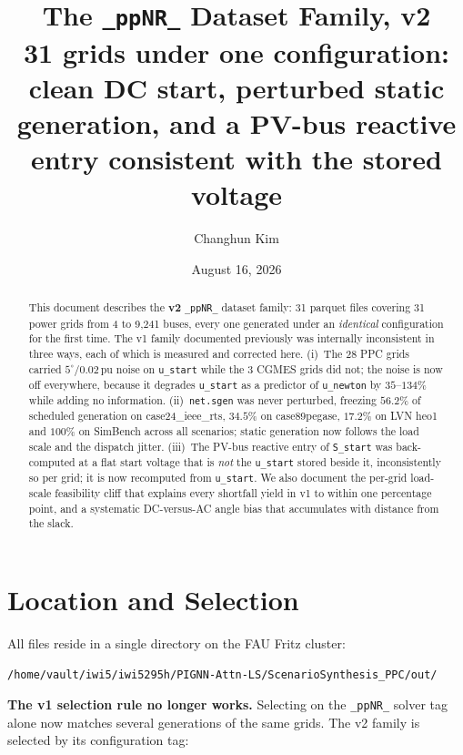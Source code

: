 \documentclass{article}
\title{The \texttt{\_ppNR\_} Dataset Family, v2\\
\large 31 grids under one configuration: clean DC start, perturbed static
generation, and a PV-bus reactive entry consistent with the stored voltage}
\author{Changhun Kim}
\date{August 16, 2026}
\newcommand{\pu}{\,\text{pu}}
\begin{document}
\maketitle

\begin{abstract}
This document describes the \textbf{v2} \texttt{\_ppNR\_} dataset family: 31
parquet files covering 31 power grids from 4 to 9{,}241 buses, every one
generated under an \emph{identical} configuration for the first time.  The v1
family documented previously was internally inconsistent in three ways, each of
which is measured and corrected here.  (i)~The 28 PPC grids carried
$5^\circ/0.02\pu$ noise on \texttt{u\_start} while the 3 CGMES grids did not;
the noise is now off everywhere, because it degrades \texttt{u\_start} as a
predictor of \texttt{u\_newton} by $35$--$134\%$ while adding no information.
(ii)~\texttt{net.sgen} was never perturbed, freezing $56.2\%$ of scheduled
generation on case24\_ieee\_rts, $34.5\%$ on case89pegase, $17.2\%$ on LVN heo1
and $100\%$ on SimBench across all scenarios; static generation now follows the
load scale and the dispatch jitter.  (iii)~The PV-bus reactive entry of
\texttt{S\_start} was back-computed at a flat start voltage that is \emph{not}
the \texttt{u\_start} stored beside it, inconsistently so per grid; it is now
recomputed from \texttt{u\_start}.  We also document the per-grid load-scale
feasibility cliff that explains every shortfall yield in v1 to within one
percentage point, and a systematic DC-versus-AC angle bias that accumulates
with distance from the slack.
\end{abstract}


\section{Location and Selection}
\label{sec:sel}

All files reside in a single directory on the FAU Fritz cluster:

\begin{center}
\texttt{/home/vault/iwi5/iwi5295h/PIGNN-Attn-LS/ScenarioSynthesis\_PPC/out/}
\end{center}

\noindent
\textbf{The v1 selection rule no longer works.}  Selecting on the
\texttt{\_ppNR\_} solver tag alone now matches several generations of the same
grids.  The v2 family is selected by its configuration tag:
\end{document}

